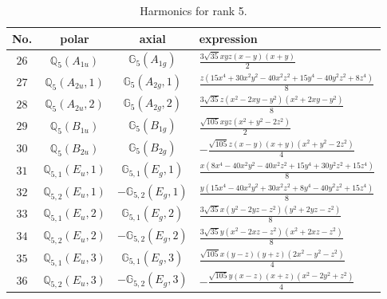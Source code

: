 \documentclass[fleqn,8pt,landscape]{jsarticle}
\begin{document}
\begin{table}[ht!]
\begin{center}
\caption{Harmonics for rank 5.}
\renewcommand{\arraystretch}{1.3}
\begin{tabular}{cccl} \hline \hline
No. & polar & axial & expression \\ \hline
$ 26 $ & $ \mathbb{Q}_{5}(A_{1u}) $ & $ \mathbb{G}_{5}(A_{1g}) $ & $ \frac{3 \sqrt{35} x y z \left(x - y\right) \left(x + y\right)}{2} $ \\
$ 27 $ & $ \mathbb{Q}_{5}(A_{2u},1) $ & $ \mathbb{G}_{5}(A_{2g},1) $ & $ \frac{z \left(15 x^{4} + 30 x^{2} y^{2} - 40 x^{2} z^{2} + 15 y^{4} - 40 y^{2} z^{2} + 8 z^{4}\right)}{8} $ \\
$ 28 $ & $ \mathbb{Q}_{5}(A_{2u},2) $ & $ \mathbb{G}_{5}(A_{2g},2) $ & $ \frac{3 \sqrt{35} z \left(x^{2} - 2 x y - y^{2}\right) \left(x^{2} + 2 x y - y^{2}\right)}{8} $ \\
$ 29 $ & $ \mathbb{Q}_{5}(B_{1u}) $ & $ \mathbb{G}_{5}(B_{1g}) $ & $ \frac{\sqrt{105} x y z \left(x^{2} + y^{2} - 2 z^{2}\right)}{2} $ \\
$ 30 $ & $ \mathbb{Q}_{5}(B_{2u}) $ & $ \mathbb{G}_{5}(B_{2g}) $ & $ - \frac{\sqrt{105} z \left(x - y\right) \left(x + y\right) \left(x^{2} + y^{2} - 2 z^{2}\right)}{4} $ \\
$ 31 $ & $ \mathbb{Q}_{5,1}(E_{u},1) $ & $ \mathbb{G}_{5,1}(E_{g},1) $ & $ \frac{x \left(8 x^{4} - 40 x^{2} y^{2} - 40 x^{2} z^{2} + 15 y^{4} + 30 y^{2} z^{2} + 15 z^{4}\right)}{8} $ \\
$ 32 $ & $ \mathbb{Q}_{5,2}(E_{u},1) $ & $ -\mathbb{G}_{5,2}(E_{g},1) $ & $ \frac{y \left(15 x^{4} - 40 x^{2} y^{2} + 30 x^{2} z^{2} + 8 y^{4} - 40 y^{2} z^{2} + 15 z^{4}\right)}{8} $ \\
$ 33 $ & $ \mathbb{Q}_{5,1}(E_{u},2) $ & $ \mathbb{G}_{5,1}(E_{g},2) $ & $ \frac{3 \sqrt{35} x \left(y^{2} - 2 y z - z^{2}\right) \left(y^{2} + 2 y z - z^{2}\right)}{8} $ \\
$ 34 $ & $ \mathbb{Q}_{5,2}(E_{u},2) $ & $ -\mathbb{G}_{5,2}(E_{g},2) $ & $ \frac{3 \sqrt{35} y \left(x^{2} - 2 x z - z^{2}\right) \left(x^{2} + 2 x z - z^{2}\right)}{8} $ \\
$ 35 $ & $ \mathbb{Q}_{5,1}(E_{u},3) $ & $ \mathbb{G}_{5,1}(E_{g},3) $ & $ \frac{\sqrt{105} x \left(y - z\right) \left(y + z\right) \left(2 x^{2} - y^{2} - z^{2}\right)}{4} $ \\
$ 36 $ & $ \mathbb{Q}_{5,2}(E_{u},3) $ & $ -\mathbb{G}_{5,2}(E_{g},3) $ & $ - \frac{\sqrt{105} y \left(x - z\right) \left(x + z\right) \left(x^{2} - 2 y^{2} + z^{2}\right)}{4} $ \\
 \hline \hline
\end{tabular}
\end{center}
\end{table}
\end{document}
